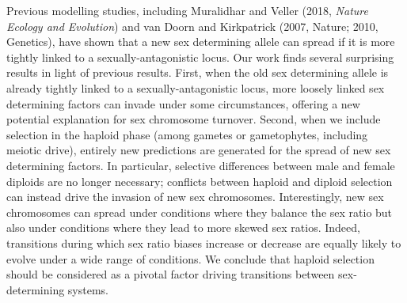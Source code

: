 \documentclass[12pt,letterpaper]{article}
\begin{document}
Previous modelling studies, including Muralidhar and Veller (2018, \textit{Nature Ecology and Evolution}) and van Doorn and Kirkpatrick (2007, Nature; 2010, Genetics), have shown that a new sex determining allele can spread if it is more tightly linked to a sexually-antagonistic locus. Our work finds several surprising results in light of previous results. First, when the old sex determining allele is already tightly linked to a sexually-antagonistic locus, more loosely linked sex determining factors can invade under some circumstances, offering a new potential explanation for sex chromosome turnover. Second, when we include selection in the haploid phase (among gametes or gametophytes, including meiotic drive), entirely new predictions are generated for the spread of new sex determining factors.
In particular, selective differences between male and female diploids are no longer necessary;  conflicts between haploid and diploid selection can instead drive the invasion of new sex chromosomes. Interestingly, new sex chromosomes can spread under conditions where they balance the sex ratio but also under conditions where they lead to more skewed sex ratios. Indeed, transitions during which sex ratio biases increase or decrease are equally likely to evolve under a wide range of conditions. We conclude that haploid selection should be considered as a pivotal factor driving transitions between sex-determining systems. \\

\end{document}
